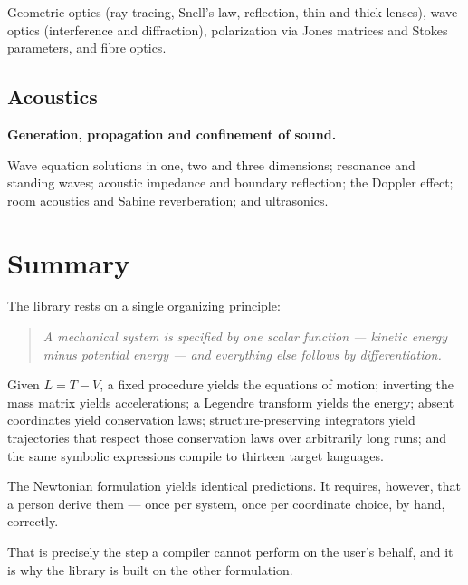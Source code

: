 \documentclass[11pt,a4paper]{article}
\begin{document}
Geometric optics (ray tracing, Snell's law, reflection, thin and thick lenses), wave optics
(interference and diffraction), polarization via Jones matrices and Stokes parameters, and fibre
optics.

\subsection{Acoustics}

\textbf{Generation, propagation and confinement of sound.}

Wave equation solutions in one, two and three dimensions; resonance and standing waves; acoustic
impedance and boundary reflection; the Doppler effect; room acoustics and Sabine reverberation; and
ultrasonics.

\section{Summary}

The library rests on a single organizing principle:

\begin{quote}
\itshape
A mechanical system is specified by one scalar function --- kinetic energy minus potential energy ---
and everything else follows by differentiation.
\end{quote}

Given $L = T - V$, a fixed procedure yields the equations of motion; inverting the mass matrix yields
accelerations; a Legendre transform yields the energy; absent coordinates yield conservation laws;
structure-preserving integrators yield trajectories that respect those conservation laws over
arbitrarily long runs; and the same symbolic expressions compile to thirteen target languages.

The Newtonian formulation yields identical predictions. It requires, however, that a person derive
them --- once per system, once per coordinate choice, by hand, correctly.

That is precisely the step a compiler cannot perform on the user's behalf, and it is why the library
is built on the other formulation.
\end{document}

